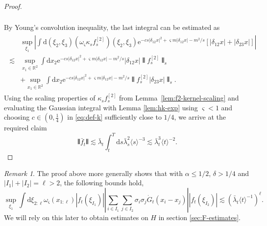 \documentclass[11pt, a4paper]{scrartcl}
\numberwithin{equation}{section}
\theoremstyle{plain}
\theoremstyle{remark}
\newtheorem{remark}[foo]{Remark}
\newcommand{\mathd}{\mathrm{d}}
\newcommand{\mathe}{\mathrm{e}}
\begin{document}
\begin{proof}
\begin{align}
\begin{split}
		\end{split}
	\end{align}
	By Young's convolution inequality, the last integral can be estimated as
	\begin{align*}
		\begin{split}
			         & \sup_{\xi_1} \left| \int \mathd (\xi_2, \xi_3) (\omega_{\varsigma} \kappa_s f_s^{[2]}) (\xi_2, \xi_3) \mathe^{- cs | \delta_{12} x
				|^2 + \varsigma m | \delta_{12} x | - m^2 / s}  [| \delta_{12} x | + |
			\delta_{23} x |] \right|                                                                                                                      \\
			\lesssim & \sup_{x_1 \in \mathbb{R}^2}  \int \mathd x_2 \mathe^{- cs |
				\delta_{12} x |^2 + \varsigma m | \delta_{12} x | - m^2 / s} |
			\delta_{12} x |  \interleave f_s^{[2]} \interleave_s                                                                                          \\
			         & + \sup_{x_1 \in
				\mathbb{R}^2}  \int \mathd x_2 \mathe^{- cs | \delta_{12} x |^2 +
				\varsigma m | \delta_{12} x | - m^2 / s} \interleave f^{[2]}_s |
			\delta_{23} x |\interleave_s .
		\end{split}
	\end{align*}
	Using the scaling properties of $\kappa_s f_s^{[2]}$ from
	Lemma~\ref{lem:f2-kernel-scaling} and evaluating the Gaussian integral with
	Lemma \ref{lem:hk-exp} using $\varsigma < 1$ and choosing $c \in \left( 0,
		\frac{1}{4} \right)$ in \eqref{eq:def-k} sufficiently close to $1 / 4$, we
	arrive at the required claim
	\[ \interleave \bar{f}_t \interleave \lesssim \bar{\lambda}_t  \int_t^T \mathd s
		\bar{\lambda}_s^2 \langle s \rangle^{- 3} \lesssim \bar{\lambda}_t^3 \langle t
		\rangle^{- 2} . \]
\end{proof}

\begin{remark}
	\label{rem:h-estimates}The proof above more generally shows that with
	$\alpha \leqslant 1 / 2$, $\delta > 1 / 4$ and $| I_1 | + | I_2 | = \ell >
		2$, the following bounds hold,
	\begin{equation}
		\sup_{\xi_1}  \int \mathd \xi_{2 : \ell} \omega_{\varsigma} (x_{1 : \ell})
		| f_t (\xi_{I_1}) | \left| \sum_{i \in I_1} \sum_{j \in I_2} \sigma_i
		\sigma_j  \dot{G}_t (x_i - x_j) \right| | f_t  (\xi_{I_2}) | \lesssim
		(\bar{\lambda}_t \langle t \rangle^{- 1})^{\ell} \label{eq:h-estimates}.
	\end{equation}
	We will rely on this later to obtain estimates on $H$ in section \ref{sec:F-estimates}.
\end{remark}
\end{document}
